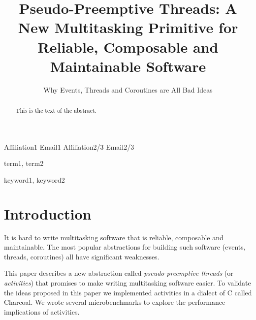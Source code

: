\documentclass[10pt,preprint]{sigplanconf}
\begin{document}
\newcommand{\charcoal}{Charcoal}

\setlength{\pdfpageheight}{\paperheight}
\setlength{\pdfpagewidth}{\paperwidth}



\title{Pseudo-Preemptive Threads: A New Multitasking Primitive for Reliable, Composable and Maintainable Software}
\subtitle{Why Events, Threads and Coroutines are All Bad Ideas\footnotemark}

           {Affiliation1}
           {Email1}
           {Affiliation2/3}
           {Email2/3}

\maketitle

\begin{abstract}
This is the text of the abstract.
\end{abstract}


\terms
term1, term2

\keywords
keyword1, keyword2


\section{Introduction}

It is hard to write multitasking software that is reliable, composable and maintainable.
The most popular abstractions for building such software (events, threads, coroutines) all have significant weaknesses.

This paper describes a new abstraction called \emph{pseudo-preemptive threads} (or \emph{activities}) that promises to make writing multitasking software easier.
To validate the ideas proposed in this paper we implemented activities in a dialect of C called \charcoal{}.
We wrote several microbenchmarks to explore the performance implications of activities.
\end{document}
